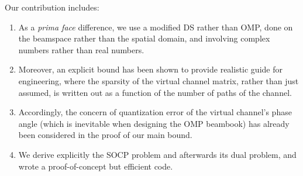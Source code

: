 Our contribution includes:

\begin{enumerate}
\item As a \textit{prima face} difference, we use a modified DS rather than OMP, done on the beamspace rather than the spatial domain, and involving complex numbers rather than real numbers.
\item Moreover, an explicit bound has been shown to provide realistic guide for engineering, where the sparsity of the virtual channel matrix, rather than just assumed, is written out as a function of the number of paths of the channel.
\item Accordingly, the concern of quantization error of the virtual channel's phase angle (which is inevitable when designing the OMP beambook) has already been considered in the proof of our main bound.
\item We derive explicitly the SOCP problem and afterwards its dual problem, and wrote a proof-of-concept but efficient code.
\end{enumerate}
